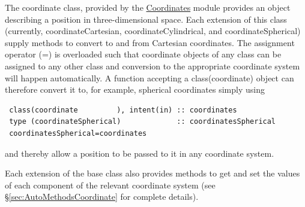 The {\normalfont \ttfamily coordinate} class, provided by the \hyperlink{objects.coordinates.F90:coordinates}{\normalfont \ttfamily Coordinates} module provides an object describing a position in three-dimensional space. Each extension of this class (currently, {\normalfont \ttfamily coordinateCartesian}, {\normalfont \ttfamily coordinateCylindrical}, and {\normalfont \ttfamily coordinateSpherical}) supply methods to convert to and from Cartesian coordinates. The assignment operator ({\normalfont \ttfamily =}) is overloaded such that coordinate objects of any class can be assigned to any other class and conversion to the appropriate coordinate system will happen automatically. A function accepting a {\normalfont \ttfamily class(coordinate)} object can therefore convert it to, for example, spherical coordinates simply using
\begin{verbatim}
 class(coordinate         ), intent(in) :: coordinates
 type (coordinateSpherical)             :: coordinatesSpherical
 coordinatesSpherical=coordinates
\end{verbatim}
and thereby allow a position to be passed to it in any coordinate system.

Each extension of the base class also provides methods to get and set the values of each component of the relevant coordinate system (see \S\ref{sec:AutoMethodsCoordinate} for complete details).
